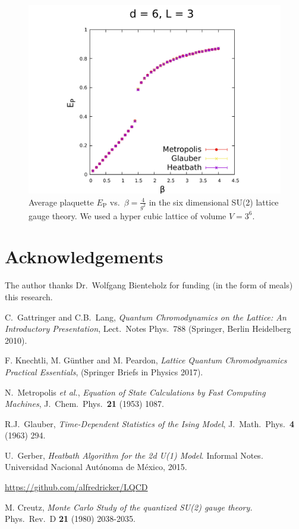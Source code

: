\documentclass[12pt,a4paper]{article}
\begin{document}
	\begin{figure}
	\label{fig:d=6_L=3}
	\begin{center}
	\includegraphics[scale=0.7]{../images/d=6_L=3_metropolis.pdf}
	\caption{Average plaquette $E_{\text{P}}$ vs.\ $\beta=\frac{4}{g^2}$ in the six dimensional SU(2) lattice gauge theory. We used a hyper cubic lattice of volume $V=3^6$.}
	\end{center}
	\end{figure}


\section{Acknowledgements}
The author thanks Dr.\ Wolfgang Bienteholz for funding (in the form of meals) this research.




\begin{thebibliography}{99}

 C.\ Gattringer and C.B.\ Lang, \emph{Quantum Chromodynamics on the Lattice: An Introductory Presentation},  Lect.\ Notes Phys.\ 788 (Springer, Berlin Heidelberg 2010).

 F. Knechtli, M. Günther and M. Peardon, \emph{Lattice Quantum Chromodynamics Practical Essentials}, 
(Springer Briefs in Physics 2017).

 N.\ Metropolis {\it et al.},
\emph{Equation of State Calculations by Fast Computing Machines},
J.\ Chem.\ Phys.\ {\bf 21} (1953) 1087.

 R.J.\ Glauber,
  \emph{Time-Dependent Statistics of the Ising Model},
  J.\ Math.\ Phys.\ {\bf 4} (1963) 294.
  
 U.\ Gerber,
  \emph{Heatbath Algorithm for the 2d U(1) Model}.
  Informal Notes. Universidad Nacional Autónoma de México, 2015.  
  
 \url{https://github.com/alfredricker/LQCD}

 M. Creutz, \emph{Monte Carlo Study of the quantized SU(2) gauge theory.} Phys.\ Rev.\ D {\bf 21} (1980) 2038-2035.

\end{thebibliography}
	
\end{document}
